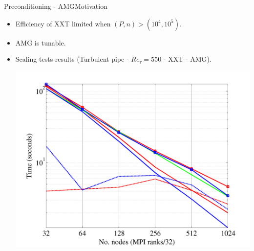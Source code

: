 \documentclass[usenames,dvipsnames,svgnames,9pt]{beamer}
\begin{document}
\begin{frame}{Preconditioning - AMG}{Motivation}
\begin{itemize}
\item Efficiency of XXT limited when $(P,n) > (10^4, 10^5)$.
\item AMG is tunable.
\item Scaling tests results (Turbulent pipe - $Re_{\tau} = 550$ - {\color{red} XXT} - {\color{blue} AMG}).

\centering
\includegraphics[width=0.7\linewidth]{BeskowReTau550.png}
\end{itemize}

\end{frame}
\end{document}
